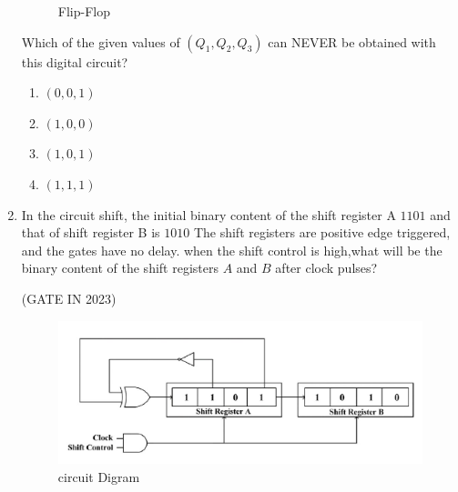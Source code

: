 \begin{enumerate}
\begin{figure}[H]
\centering

\caption{Flip-Flop}
\label{fig:Flip-Flop}
\end{figure}
Which of the given values of \((Q_1, Q_2, Q_3)\) can NEVER be obtained with this digital circuit?
\begin{enumerate}
    
    \item ${(0,0,1)}$
    \item ${(1,0,0)}$
    \item ${(1,0,1)}$
    \item ${(1,1,1)}$
\end{enumerate}
\item In the circuit shift, the initial binary content of the shift register A $1101$ and that of shift register B is $1010$ The shift registers are positive edge triggered, and the gates have no delay.
when the shift control is high,what will be the binary content of the shift registers $A$ and $B$ after clock pulses?

\hfill{(GATE IN 2023)}

\begin{figure}[H]
\centering
\includegraphics[width=\columnwidth]{ide/7474/figs/Gate.png}
\caption{circuit Digram}
\label{fig:cricuit Digram}
\end{figure}


\end{enumerate}
